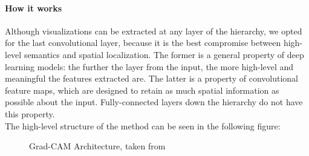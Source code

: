 \documentclass[../main.tex]{subfiles}
\begin{document}
    \paragraph{How it works}

    Although visualizations can be extracted at any layer of the hierarchy, we opted for the last convolutional layer,
    because it is the best compromise between high-level semantics and spatial localization.
    The former is a general property of deep learning models: the further the layer from the input,
    the more high-level and meaningful the features extracted are. The latter is a property of
    convolutional feature maps, which are designed to retain as much spatial information as possible about
    the input. Fully-connected layers down the hierarchy do not have this property. \\
    The high-level structure of the method can be seen in the following figure:

	\begin{figure}[h!]
        \centering{}
	    \caption{Grad-CAM Architecture, taken from~\cite{gradcam}}\label{fig:gradcam-architecture}
	\end{figure}
\end{document}
